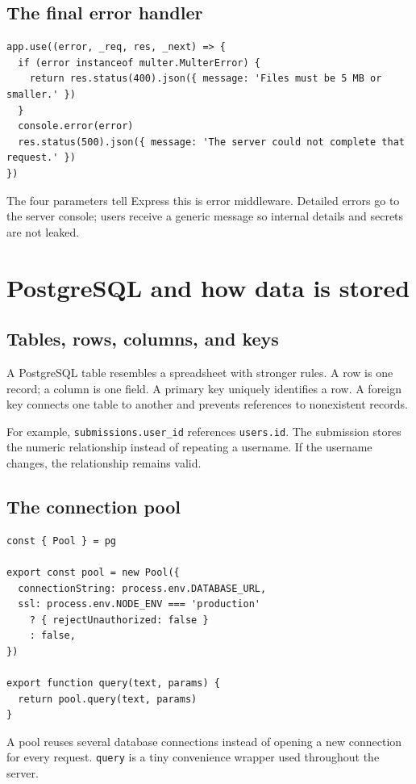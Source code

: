 \documentclass[11pt,oneside]{book}
\newcommand{\code}[1]{\texttt{#1}}
\begin{document}
\section{The final error handler}
\begin{lstlisting}
app.use((error, _req, res, _next) => {
  if (error instanceof multer.MulterError) {
    return res.status(400).json({ message: 'Files must be 5 MB or smaller.' })
  }
  console.error(error)
  res.status(500).json({ message: 'The server could not complete that request.' })
})
\end{lstlisting}

The four parameters tell Express this is error middleware. Detailed errors go to the server console; users receive a generic message so internal details and secrets are not leaked.

\chapter{PostgreSQL and how data is stored}

\section{Tables, rows, columns, and keys}
A PostgreSQL table resembles a spreadsheet with stronger rules. A row is one record; a column is one field. A primary key uniquely identifies a row. A foreign key connects one table to another and prevents references to nonexistent records.

For example, \code{submissions.user\_id} references \code{users.id}. The submission stores the numeric relationship instead of repeating a username. If the username changes, the relationship remains valid.

\section{The connection pool}
\begin{lstlisting}[title={server/db.js}]
const { Pool } = pg

export const pool = new Pool({
  connectionString: process.env.DATABASE_URL,
  ssl: process.env.NODE_ENV === 'production'
    ? { rejectUnauthorized: false }
    : false,
})

export function query(text, params) {
  return pool.query(text, params)
}
\end{lstlisting}

A pool reuses several database connections instead of opening a new connection for every request. \code{query} is a tiny convenience wrapper used throughout the server.
\end{document}
